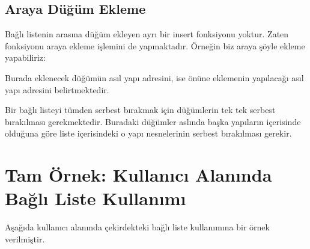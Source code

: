 \documentclass[a4paper,10pt,turkish]{sphinxmanual}
\begin{document}
\subsection{Araya Düğüm Ekleme}
\label{\detokenize{kernellinkedlistandhashtable:araya-dugum-ekleme}}
\sphinxAtStartPar
Bağlı listenin arasına düğüm ekleyen ayrı bir insert fonksiyonu yoktur. Zaten  fonksiyonu
araya ekleme işlemini de yapmaktadır. Örneğin biz araya şöyle ekleme yapabiliriz:

\begin{sphinxVerbatim}[commandchars=\\\{\}]
\end{sphinxVerbatim}

\sphinxAtStartPar
Burada  eklenecek düğümün asıl yapı adresini,  ise önüne eklemenin yapılacağı asıl
yapı adresini belirtmektedir.

\sphinxAtStartPar
Bir bağlı listeyi tümden serbest bırakmak için düğümlerin tek tek serbest bırakılması gerekmektedir.
Buradaki düğümler aslında başka yapıların içerisinde olduğuna göre liste içerisindeki o yapı nesnelerinin
serbest bırakılması gerekir.


\section{Tam Örnek: Kullanıcı Alanında Bağlı Liste Kullanımı}
\label{\detokenize{kernellinkedlistandhashtable:tam-ornek-kullanici-alaninda-bagli-liste-kullanimi}}
\sphinxAtStartPar
Aşağıda kullanıcı alanında çekirdekteki bağlı liste kullanımına bir örnek verilmiştir.
\end{document}
